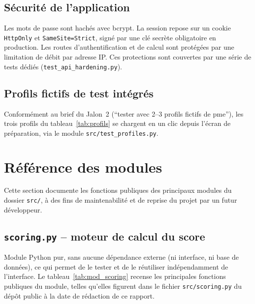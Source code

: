 \subsection{Sécurité de l'application}

Les mots de passe sont hachés avec bcrypt. La session repose sur un cookie \texttt{HttpOnly} et \texttt{SameSite=Strict}, signé par une clé secrète obligatoire en production. Les routes d'authentification et de calcul sont protégées par une limitation de débit par adresse IP. Ces protections sont couvertes par une série de tests dédiés (\texttt{test\_api\_hardening.py}).

\subsection{Profils fictifs de test intégrés}

Conformément au brief du Jalon~2 (\enquote{tester avec 2--3 profils fictifs de \gls{pme}}), les trois profils du tableau~\ref{tab:profils} se chargent en un clic depuis l'écran de préparation, via le module \texttt{src/test\_profiles.py}.

\section{Référence des modules}
\label{sec:modules}

\hspace{1cm}Cette section documente les fonctions publiques des principaux modules du dossier \texttt{src/}, à des fins de maintenabilité et de reprise du projet par un futur développeur.

\subsection{\texttt{scoring.py} -- moteur de calcul du score}

Module Python pur, sans aucune dépendance externe (ni interface, ni base de données), ce qui permet de le tester et de le réutiliser indépendamment de l'interface. Le tableau~\ref{tab:mod_scoring} recense les principales fonctions publiques du module, telles qu'elles figurent dans le fichier \texttt{src/scoring.py} du dépôt public à la date de rédaction de ce rapport.

